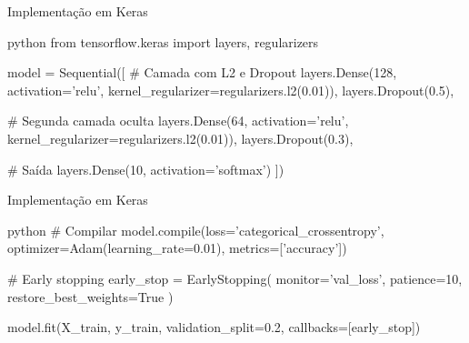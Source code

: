 \documentclass[xcolor=dvipsnames,t,aspectratio=169]{beamer}
\begin{document}
\begin{frame}[c, fragile]{Implementação em Keras}
    \begin{code}{python}
from tensorflow.keras import layers, regularizers

model = Sequential([
    # Camada com L2 e Dropout
    layers.Dense(128, 
                activation='relu',
                kernel_regularizer=regularizers.l2(0.01)),
    layers.Dropout(0.5),
    
    # Segunda camada oculta
    layers.Dense(64, 
                activation='relu',
                kernel_regularizer=regularizers.l2(0.01)),
    layers.Dropout(0.3),
    
    # Saída
    layers.Dense(10, activation='softmax')
])
    \end{code}

\end{frame}

\begin{frame}[c, fragile]{Implementação em Keras}
    \begin{code}{python} 
    # Compilar
    model.compile(loss='categorical_crossentropy',
              optimizer=Adam(learning_rate=0.01),
              metrics=['accuracy'])

    # Early stopping
    early_stop = EarlyStopping(
        monitor='val_loss',
        patience=10,
        restore_best_weights=True
    )

    model.fit(X_train, y_train,
            validation_split=0.2,
            callbacks=[early_stop])
    \end{code}
\end{frame}
\end{document}
